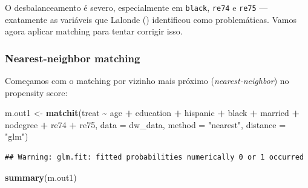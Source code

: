\documentclass[
]{article}
\newenvironment{Shaded}{\begin{snugshade}}{\end{snugshade}}
\newcommand{\AttributeTok}[1]{\textcolor[rgb]{0.13,0.29,0.53}{#1}}
\newcommand{\FunctionTok}[1]{\textcolor[rgb]{0.13,0.29,0.53}{\textbf{#1}}}
\newcommand{\NormalTok}[1]{#1}
\newcommand{\OtherTok}[1]{\textcolor[rgb]{0.56,0.35,0.01}{#1}}
\newcommand{\SpecialCharTok}[1]{\textcolor[rgb]{0.81,0.36,0.00}{\textbf{#1}}}
\newcommand{\StringTok}[1]{\textcolor[rgb]{0.31,0.60,0.02}{#1}}
\begin{document}
O desbalanceamento é severo, especialmente em \texttt{black}, \texttt{re74} e \texttt{re75} --- exatamente as variáveis que Lalonde () identificou como problemáticas. Vamos agora aplicar matching para tentar corrigir isso.

\subsubsection{Nearest-neighbor matching}\label{nearest-neighbor-matching}

Começamos com o matching por vizinho mais próximo (\emph{nearest-neighbor}) no propensity score:

\begin{Shaded}
\begin{Highlighting}[]
\NormalTok{m.out1 }\OtherTok{\textless{}{-}} \FunctionTok{matchit}\NormalTok{(treat }\SpecialCharTok{\textasciitilde{}}\NormalTok{ age }\SpecialCharTok{+}\NormalTok{ education }\SpecialCharTok{+}\NormalTok{ hispanic }\SpecialCharTok{+}\NormalTok{ black }\SpecialCharTok{+}\NormalTok{ married }\SpecialCharTok{+}\NormalTok{ nodegree }\SpecialCharTok{+}\NormalTok{ re74 }\SpecialCharTok{+}\NormalTok{ re75,}
                  \AttributeTok{data =}\NormalTok{ dw\_data,}
                  \AttributeTok{method =} \StringTok{"nearest"}\NormalTok{,}
                  \AttributeTok{distance =} \StringTok{"glm"}\NormalTok{)}
\end{Highlighting}
\end{Shaded}

\begin{verbatim}
## Warning: glm.fit: fitted probabilities numerically 0 or 1 occurred
\end{verbatim}

\begin{Shaded}
\begin{Highlighting}[]
\FunctionTok{summary}\NormalTok{(m.out1)}
\end{Highlighting}
\end{Shaded}
\end{document}
